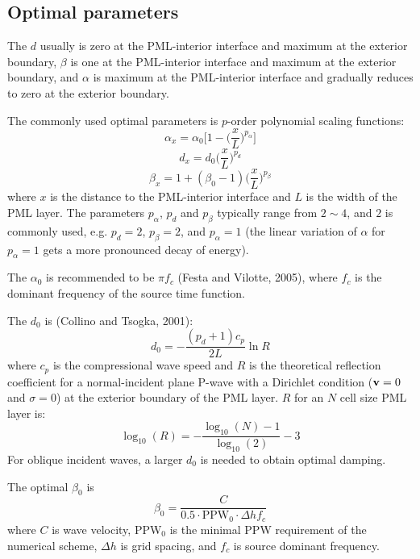 \subsection{Optimal parameters}
The $d$ usually is zero at the PML-interior interface and
maximum at the exterior boundary,
$\beta$ is one at the PML-interior interface and
maximum at the exterior boundary,
and $\alpha$ is maximum at the PML-interior interface and
gradually reduces to zero at the exterior boundary.

The commonly used optimal parameters is $p$-order polynomial scaling functions:
\[ \alpha_x=\alpha_0\Big[1-\Big(\frac{x}{L}\Big)^{p_\alpha}\Big] \]
\[ d_x=d_0\Big(\frac{x}{L}\Big)^{p_d} \]
\[ \beta_x=1+(\beta_0-1)\Big(\frac{x}{L}\Big)^{p_\beta} \]
where $x$ is the distance to the PML-interior interface and
$L$ is the width of the PML layer.
The parameters $p_\alpha$, $p_d$ and $p_\beta$ typically range from $2\sim4$,
and $2$ is commonly used, e.g. $p_d=2$, $p_\beta=2$,
and $p_\alpha=1$ (the linear variation of $\alpha$ for $p_\alpha=1$ gets
a more pronounced decay of energy).

The $\alpha_0$ is recommended to be $\pi f_c$ (Festa and Vilotte, 2005),
where $f_c$ is the dominant frequency of the source time function.

The $d_0$ is (Collino and Tsogka, 2001):
\[ d_0=-\frac{(p_d+1)c_p}{2L}\ln R \]
where $c_p$ is the compressional wave speed and
$R$ is the theoretical reflection coefficient for
a normal-incident plane P-wave with a Dirichlet condition
($\mathbf{v}=0$ and $\sigma=0$) at the exterior boundary of the PML layer.
$R$ for an $N$ cell size PML layer is:
\[ \log_{10}(R)=-\frac{\log_{10}(N)-1}{\log_{10}(2)}-3 \]
For oblique incident waves, a larger $d_0$ is needed to obtain optimal damping.

The optimal $\beta_0$ is
\[ \beta_0=\frac{C}{0.5\cdot \mathrm{PPW}_0\cdot\Delta hf_c} \]
where $C$ is wave velocity,
PPW$_0$ is the minimal PPW requirement of the numerical scheme,
$\Delta h$ is grid spacing, and $f_c$ is source dominant frequency.


